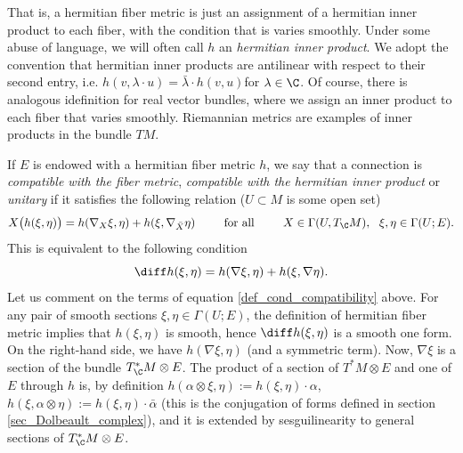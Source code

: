 That is, a hermitian fiber metric is just an assignment of a hermitian inner product to each fiber, with the condition that is varies smoothly. Under some abuse of language, we will often call \(h\) an \textit{hermitian inner product}. We adopt the convention that hermitian inner products are antilinear with respect to their second entry, i.e. \(h(v, \lambda \cdot u)= \bar{\lambda} \cdot h(v,u)\)for \(\lambda \in \C\). Of course, there is analogous idefinition for real vector bundles, where we assign an inner product to each fiber that varies smoothly. Riemannian metrics are examples of inner products in the bundle \(TM\). 

If \(E\) is endowed with a hermitian fiber metric \(h\), we say that a connection is \textit{compatible with the fiber metric}, \textit{compatible with the hermitian inner product} or \textit{unitary} if it satisfies the following relation (\(U \subset M\) is some open set)
\[
X \big(h(\xi, \eta) \big)=h(\nabla_X \xi, \eta)+h(\xi , \nabla_{\bar{X}} \eta) \hspace{0.75 cm} \text{ for all } \hspace{0.75 cm} X \in \Gamma(U, T_\C M), \ \ \xi, \eta \in \Gamma(U;E).
\]
This is equivalent to the following condition
\begin{equation} \label{def_cond_compatibility}
\diff h(\xi,\eta)=h(\nabla \xi, \eta) + h(\xi, \nabla \eta).
\end{equation}
Let us comment on the terms of equation \eqref{def_cond_compatibility} above. For any pair of smooth sections \(\xi, \eta \in \Gamma(U;E)\), the definition of hermitian fiber metric implies that \(h(\xi,\eta)\) is smooth, hence \(\diff h(\xi, \eta)\) is a smooth one form. On the right-hand side, we have \(h(\nabla \xi, \eta)\) (and a symmetric term). Now, \(\nabla \xi\) is a section of the bundle \(T^*_\C M \otimes E\). The product of a section of \(T^*M \otimes E\) and one of \(E\) through \(h\) is, by definition \(h(\alpha \otimes \xi, \eta):=h(\xi, \eta) \cdot\alpha\), \(h(\xi, \alpha \otimes \eta):=h(\xi,\eta)\cdot\bar{\alpha}\) (this is the conjugation of forms defined in section \ref{sec_Dolbeault_complex}), and it is extended by sesguilinearity to general sections of \(T^*_\C M \otimes E\).


